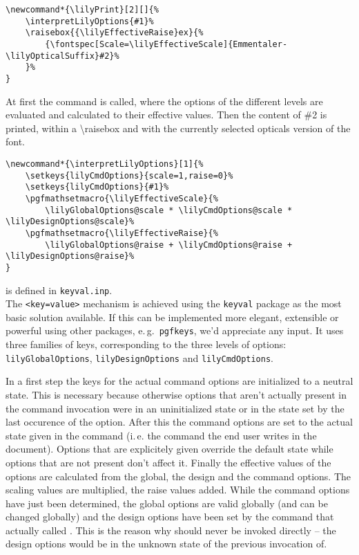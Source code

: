 \documentclass{article}
\begin{document}
\begin{verbatim}
\newcommand*{\lilyPrint}[2][]{%
    \interpretLilyOptions{#1}%
    \raisebox{{\lilyEffectiveRaise}ex}{%
        {\fontspec[Scale=\lilyEffectiveScale]{Emmentaler-\lilyOpticalSuffix}#2}%
    }%
}
\end{verbatim}

At first the command  is called, where the options of the different levels are evaluated and calculated to their effective values.
Then the content of \#2 is printed, within a \textbackslash raisebox and with the currently selected opticals version of the \emmentaler font.

\begin{verbatim}
\newcommand*{\interpretLilyOptions}[1]{%
    \setkeys{lilyCmdOptions}{scale=1,raise=0}%
    \setkeys{lilyCmdOptions}{#1}%
    \pgfmathsetmacro{\lilyEffectiveScale}{%
        \lilyGlobalOptions@scale * \lilyCmdOptions@scale * \lilyDesignOptions@scale}%
    \pgfmathsetmacro{\lilyEffectiveRaise}{%
        \lilyGlobalOptions@raise + \lilyCmdOptions@raise + \lilyDesignOptions@raise}%
}
\end{verbatim}
 is defined in \texttt{keyval.inp}.\\
The \texttt{<key=value>} mechanism is achieved using the \texttt{keyval} package as the most basic solution available.
{\color{red} If this can be implemented more elegant, extensible or powerful using other packages, e.\,g.\ \texttt{pgfkeys}, we'd appreciate any input.}
It uses three families of keys, corresponding to the three levels of options:
\texttt{lilyGlobalOptions}, \texttt{lilyDesignOptions} and \texttt{lilyCmdOptions}.

In a first step the keys for the actual command options are initialized to a neutral state.
This is necessary because otherwise options that aren't actually present in the command invocation were in an uninitialized state or in the state set by the last occurence of the option.
After this the command options are set to the actual state given in the command (i.\,e. the command the end user writes in the document).
Options that are explicitely given override the default state while options that are not present don't affect it.
Finally the effective values of the options are calculated from the global, the design and the command options. 
The scaling values are multiplied, the raise values added.
While the command options have just been determined, the global options are valid globally (and can be changed globally) and the design options have been set by the command that actually called .
This is the reason why  should never be invoked directly -- the design options would be in the unknown state of the previous invocation of.
\end{document}
